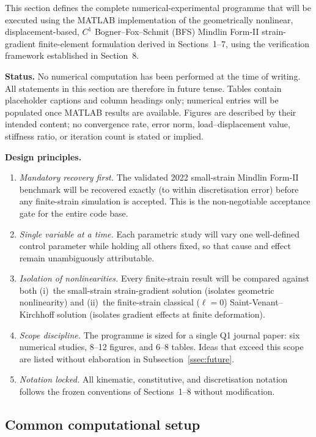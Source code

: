 \documentclass[11pt]{article}
\begin{document}
This section defines the complete numerical-experimental programme
that will be executed using the MATLAB implementation of the
geometrically nonlinear, displacement-based, $C^1$
Bogner--Fox--Schmit (BFS) Mindlin Form-II strain-gradient
finite-element formulation derived in Sections~1--7, using the
verification framework established in Section~8.

\textbf{Status.} No numerical computation has been performed at the
time of writing.  All statements in this section are therefore in
future tense.  Tables contain placeholder captions and column
headings only; numerical entries will be populated once MATLAB
results are available.  Figures are described by their intended
content; no convergence rate, error norm, load--displacement value,
stiffness ratio, or iteration count is stated or implied.

\textbf{Design principles.}
\begin{enumerate}
  \item \emph{Mandatory recovery first.}  The validated 2022
    small-strain Mindlin Form-II benchmark will be recovered exactly
    (to within discretisation error) before any finite-strain
    simulation is accepted.  This is the non-negotiable acceptance
    gate for the entire code base.
  \item \emph{Single variable at a time.}  Each parametric study will
    vary one well-defined control parameter while holding all others
    fixed, so that cause and effect remain unambiguously
    attributable.
  \item \emph{Isolation of nonlinearities.}  Every finite-strain
    result will be compared against both (i)~the small-strain
    strain-gradient solution (isolates geometric nonlinearity) and
    (ii)~the finite-strain classical ($\ell=0$) Saint-Venant--Kirchhoff
    solution (isolates gradient effects at finite deformation).
  \item \emph{Scope discipline.}  The programme is sized for a single
    Q1 journal paper: six numerical studies, 8--12 figures, and
    6--8 tables.  Ideas that exceed this scope are listed without
    elaboration in Subsection~\ref{ssec:future}.
  \item \emph{Notation locked.}  All kinematic, constitutive, and
    discretisation notation follows the frozen conventions of
    Sections~1--8 without modification.
\end{enumerate}

\subsection{Common computational setup}
\label{ssec:s9_setup}
\end{document}
